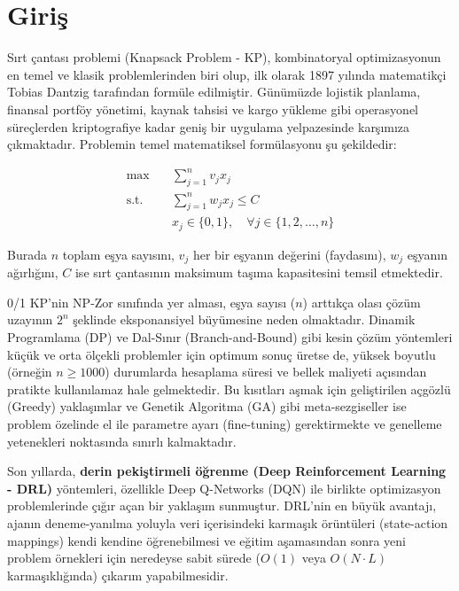 \documentclass[conference]{IEEEtran}
\begin{document}
\section{Giriş}
\label{sec:giris}
Sırt çantası problemi (Knapsack Problem - KP), kombinatoryal optimizasyonun en temel ve klasik problemlerinden biri olup, ilk olarak 1897 yılında matematikçi Tobias Dantzig tarafından formüle edilmiştir. Günümüzde lojistik planlama, finansal portföy yönetimi, kaynak tahsisi ve kargo yükleme gibi operasyonel süreçlerden kriptografiye kadar geniş bir uygulama yelpazesinde karşımıza çıkmaktadır. Problemin temel matematiksel formülasyonu şu şekildedir:

\[
\begin{aligned}
\max \quad & \sum_{j=1}^{n} v_j x_j \\
\text{s.t.} \quad & \sum_{j=1}^{n} w_j x_j \leq C \\
& x_j \in \{0,1\}, \quad \forall j \in \{1,2,\dots,n\}
\end{aligned}
\]

Burada $n$ toplam eşya sayısını, $v_j$ her bir eşyanın değerini (faydasını), $w_j$ eşyanın ağırlığını, $C$ ise sırt çantasının maksimum taşıma kapasitesini temsil etmektedir.

0/1 KP'nin NP-Zor sınıfında yer alması, eşya sayısı ($n$) arttıkça olası çözüm uzayının $2^n$ şeklinde eksponansiyel büyümesine neden olmaktadır. Dinamik Programlama (DP) ve Dal-Sınır (Branch-and-Bound) gibi kesin çözüm yöntemleri küçük ve orta ölçekli problemler için optimum sonuç üretse de, yüksek boyutlu (örneğin $n \geq 1000$) durumlarda hesaplama süresi ve bellek maliyeti açısından pratikte kullanılamaz hale gelmektedir. Bu kısıtları aşmak için geliştirilen açgözlü (Greedy) yaklaşımlar ve Genetik Algoritma (GA) gibi meta-sezgiseller ise problem özelinde el ile parametre ayarı (fine-tuning) gerektirmekte ve genelleme yetenekleri noktasında sınırlı kalmaktadır.



Son yıllarda, \textbf{derin pekiştirmeli öğrenme (Deep Reinforcement Learning - DRL)} yöntemleri, özellikle Deep Q-Networks (DQN) \cite{mnih2015} ile birlikte optimizasyon problemlerinde çığır açan bir yaklaşım sunmuştur. DRL'nin en büyük avantajı, ajanın deneme-yanılma yoluyla veri içerisindeki karmaşık örüntüleri (state-action mappings) kendi kendine öğrenebilmesi ve eğitim aşamasından sonra yeni problem örnekleri için neredeyse sabit sürede ($O(1)$ veya $O(N \cdot L)$ karmaşıklığında) çıkarım yapabilmesidir.
\end{document}
